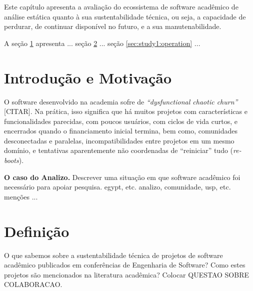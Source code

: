 {Este capítulo apresenta a avaliação do ecossistema de software acadêmico de
análise estática quanto à sua sustentabilidade técnica, ou seja, a capacidade
de perdurar, de continuar disponível no futuro, e a sua manutenabilidade.}

A seção \ref{sec:study1:intro} apresenta ...
seção \ref{sec:study1:definition} ...
seção \ref{sec:study1:operation} ...


\section{Introdução e Motivação} \label{sec:study1:intro}


O software desenvolvido na academia sofre de {\it ``dysfunctional chaotic churn''} [CITAR].
Na prática, isso significa que há muitos projetos com características e funcionalidades parecidas, 
com poucos usuários, com ciclos de vida curtos, e encerrados quando o financiamento inicial termina,
bem como, comunidades desconectadas e paralelas, incompatibilidades entre projetos em um mesmo domínio, 
e tentativas aparentemente não coordenadas de ``reiniciar'' tudo ({\it re-boots}).


\textbf{O caso do Analizo.}  Descrever uma situação em que software acadêmico foi necessário
para apoiar pesquisa. egypt, etc. analizo, comunidade, usp, etc.
menções ...




\section{Definição} \label{sec:study1:definition}


O que sabemos sobre a sustentabilidade técnica de projetos de software acadêmico publicados em conferências
de Engenharia de Software? Como estes projetos são mencionados na literatura acadêmica?   
Colocar QUESTAO SOBRE COLABORACAO.


